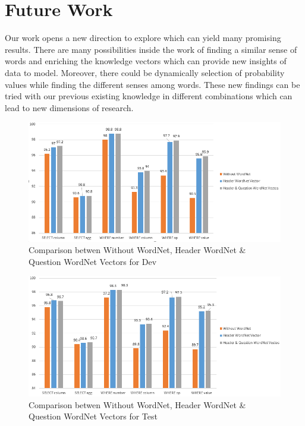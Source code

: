 \documentclass[12pt]{article}
\begin{document}
\section{Future Work}
Our work opens a new direction to explore which can yield many promising results. There are many possibilities inside the work of finding a similar sense of words and enriching the knowledge vectors which can provide new insights of data to model. Moreover, there could be dynamically selection of probability values while finding the different senses among words. These new findings can be tried with our previous existing knowledge in different combinations which can lead to new dimensions of research. 



\begin{figure}[H]
    \includegraphics[width=400pt]{devset}
    \caption{Comparison betwen Without WordNet, Header WordNet \&  Question WordNet Vectors for Dev}
    \label{devset}
\end{figure}


\begin{figure}[H]
    \includegraphics[width=400pt]{testset}
    \caption{Comparison betwen Without WordNet, Header WordNet \&  Question WordNet Vectors for Test}
    \label{testset}
\end{figure}



\end{document}
